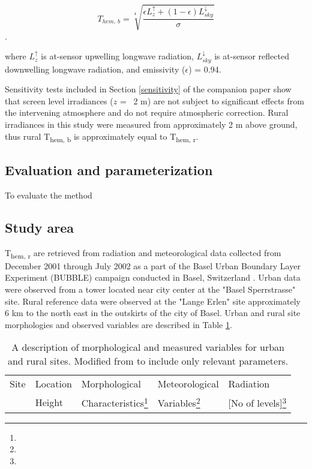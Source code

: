 \begin{bibunit}
\begin{equation}
\label{ruralt}
T_{hem,~ b} = \sqrt[4]{\frac{\epsilon L_z^\uparrow + (1 - \epsilon)L_{sky}^\downarrow}{\sigma}}
\end{equation}.

\noindent where $L_z^\uparrow$ is at-sensor upwelling longwave radiation, $L_{sky}^\downarrow$ is at-sensor reflected downwelling longwave radiation, and emissivity ($\epsilon$) = 0.94.

Sensitivity tests included in Section \ref{sensitivity} of the companion paper show that screen level irradiances ($ z $ = ~2 \si{\meter}) are not subject to significant effects from the intervening atmosphere and do not require atmospheric correction. Rural irradiances in this study were measured from approximately 2 \si{\meter} above ground, thus rural T\textsubscript{hem, b} is approximately equal to T\textsubscript{hem, r}.

\subsection{Evaluation and parameterization}

To evaluate the method

\subsection{Study area}

T\textsubscript{hem, r} are retrieved from radiation and meteorological data collected from December 2001 through July 2002 as a part of the Basel Urban Boundary Layer Experiment (BUBBLE) campaign conducted in Basel, Switzerland \citep{Rotach2005}. Urban data were observed from a tower located near city center at the "Basel Sperrstrasse" site. Rural reference data were observed at the "Lange Erlen" site approximately 6 \si{\kilo \meter} to the north east in the outskirts of the city of Basel. Urban and rural site morphologies and observed variables are described in Table \ref{morphbspr}.

\begin{table}[H]
	\centering
	\caption{A description of morphological and measured variables for urban and rural sites. Modified from \citet{Rotach2005} to include only relevant parameters.}
	\label{morphbspr}
	\begin{tabular*}{\textwidth}{p{3.75cm} p{2.25cm}p{3.5cm}p{2.75cm}p{2.75cm}}
		\toprule 
		Site & Location & Morphological & Meteorological & Radiation \\ 
		& Height & Characteristics\footnote{} & Variables\footnote{} & [No of levels]\footnote{} \\ 	\midrule
		

\end{tabular*}
\end{table}
\end{bibunit}
